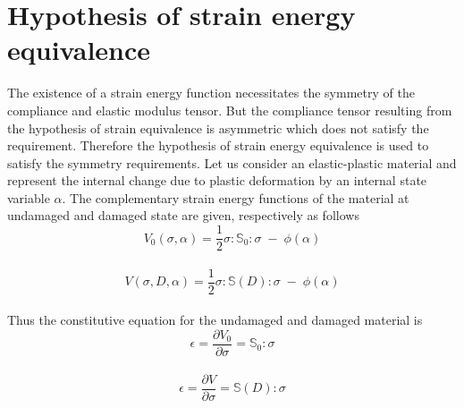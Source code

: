 \documentclass[12pt,twoside]{report}
\begin{document}
\section{Hypothesis of strain energy equivalence}\label{Hypothesis of strain energy equivalence}
\indent\indent\indent The existence of a strain energy function necessitates the symmetry of the compliance and elastic modulus tensor. But the compliance tensor resulting from the hypothesis of strain equivalence is asymmetric which does not satisfy the requirement. Therefore the hypothesis of strain energy equivalence is used to satisfy the symmetry requirements. Let us consider an elastic-plastic material and represent the internal change due to plastic deformation by an internal state variable $\alpha$. The complementary strain energy functions of the material at undamaged and damaged state are given, respectively as follows
\\
\begin{equation}
V_{0}(\sigma,\alpha) = \frac{1}{2}\sigma : \mathbb{S}_{0} : \sigma \; - \; \phi(\alpha)
\end{equation}
\\
\begin{equation}
V(\sigma,D,\alpha) = \frac{1}{2}\sigma : \mathbb{S}(D) : \sigma \; - \; \phi(\alpha)
\end{equation}
\\
Thus the constitutive equation for the undamaged and damaged material is 
\\
\begin{equation}
\epsilon = \frac{\partial V_{0} }{\partial \sigma} = \mathbb{S}_{0} : \sigma
\end{equation}
\\
\begin{equation}
\epsilon = \frac{\partial V }{\partial \sigma} = \mathbb{S}(D) : \sigma
\label{eqn:Strain_energy_eq}
\end{equation}
\end{document}
